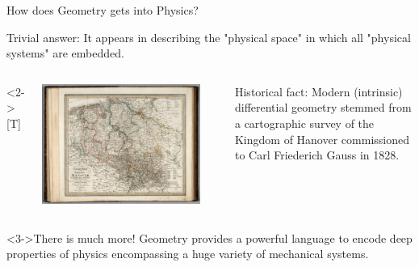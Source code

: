 \documentclass[handout,10pt]{beamer}
\begin{document}
\begin{frame}[t]{How does Geometry gets into Physics?}
	\begin{block}{Trivial answer:}
		It appears in describing the "physical space" in which all "physical systems" are embedded.
	\end{block}
	\vfill
  	\begin{columns}<2->[T]
    	\begin{column}{.45\textwidth}
    		\begin{center}
				\includegraphics[width=0.9\textwidth]{Pics/map} 		
    		\end{center}
    	\end{column}
    	\begin{column}{.55\textwidth}
    		\vspace*{1em}
			\begin{block}{Historical fact:}
				Modern (intrinsic) differential geometry stemmed from a cartographic survey of the Kingdom of Hanover commissioned to Carl Friederich Gauss in 1828.		
			\end{block}
    	\end{column}
    \end{columns}
	\vfill
	\begin{alertblock}<3->{There is much more!}
		Geometry provides a powerful language to encode deep properties of physics encompassing a huge variety of mechanical systems.
	\end{alertblock}
\end{frame}
\end{document}
